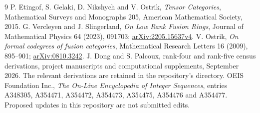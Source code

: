 \documentclass[11pt,a4paper]{article}
\theoremstyle{definition}\newtheorem{definition}[theorem]{Definition}\newtheorem{remark}[theorem]{Remark}
\begin{document}
\begin{thebibliography}{9}\small\setlength{\itemsep}{2pt}
 P. Etingof, S. Gelaki, D. Nikshych and V. Ostrik,
\emph{Tensor Categories}, Mathematical Surveys and Monographs 205,
American Mathematical Society, 2015.
 G. Vercleyen and J. Slingerland,
\emph{On Low Rank Fusion Rings}, Journal of Mathematical Physics 64 (2023),
091703; \href{https://arxiv.org/abs/2205.15637v4}{arXiv:2205.15637v4}.
 V. Ostrik, \emph{On formal codegrees of fusion categories},
Mathematical Research Letters 16 (2009), 895--901;
\href{https://arxiv.org/abs/0810.3242}{arXiv:0810.3242}.
 J. Dong and S. Palcoux, rank-four and rank-five census derivations,
project manuscripts and computational supplements, September 2026.
The relevant derivations are retained in the repository's  directory.
 OEIS Foundation Inc., \emph{The On-Line Encyclopedia of Integer
Sequences}, entries A348305, A354471, A354472, A354473, A354475, A354476
and A354477. Proposed updates in this repository are not submitted edits.
\end{thebibliography}
\end{document}
